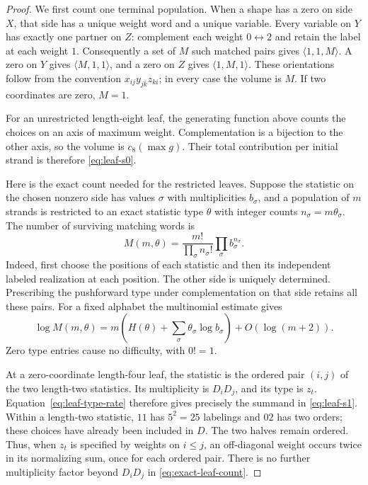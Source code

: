 \begin{proof}
We first count one terminal population.  When a shape has a zero on side
$X$, that side has a unique weight word and a unique variable.  Every
variable on $Y$ has exactly one partner on $Z$: complement each weight
$0\leftrightarrow2$ and retain the label at each weight $1$.
Consequently a set of $M$ such matched pairs gives
$\langle1,1,M\rangle$.  A zero on $Y$ gives
$\langle M,1,1\rangle$, and a zero on $Z$ gives
$\langle1,M,1\rangle$.  These orientations follow from the convention
$x_{ij}y_{jk}z_{ki}$; in every case the volume is $M$.
If two coordinates are zero, $M=1$.

For an unrestricted length-eight leaf, the generating function above
counts the choices on an axis of maximum weight.  Complementation is a
bijection to the other axis, so the volume is $c_8(\max g)$.
Their total contribution per initial strand is therefore
\eqref{eq:leaf-s0}.

Here is the exact count needed for the restricted leaves.  Suppose the
statistic on the chosen nonzero side has values $\sigma$ with
multiplicities $b_\sigma$, and a population of $m$ strands is restricted
to an exact statistic type $\theta$ with integer counts
$n_\sigma=m\theta_\sigma$.  The number of surviving matching words is
\begin{equation}
 M(m,\theta)=\frac{m!}{\prod_\sigma n_\sigma!}
                  \prod_\sigma b_\sigma^{n_\sigma}.
 \label{eq:exact-leaf-count}
\end{equation}
Indeed, first choose the positions of each statistic and then its
independent labeled realization at each position.  The other side is
uniquely determined.  Prescribing the pushforward type under
complementation on that side retains all these pairs.  For a fixed
alphabet the multinomial estimate gives
\begin{equation}
 \log M(m,\theta)
 =m\left(H(\theta)+\sum_\sigma\theta_\sigma\log b_\sigma\right)
        +O(\log(m+2)).
 \label{eq:leaf-type-rate}
\end{equation}
Zero type entries cause no difficulty, with $0!=1$.

At a zero-coordinate length-four leaf, the statistic is the ordered
pair $(i,j)$ of the two length-two statistics.  Its multiplicity is
$D_iD_j$, and its type is $z_t$.  Equation~\eqref{eq:leaf-type-rate}
therefore gives precisely the summand in \eqref{eq:leaf-s1}.
Within a length-two statistic, $11$ has $5^2=25$ labelings and $02$ has
two orders; these choices have already been included in $D$.
The two halves remain ordered.  Thus, when $z_t$ is specified by
weights on $i\leq j$, an off-diagonal weight occurs twice in its
normalizing sum, once for each ordered pair.  There is no further
multiplicity factor beyond $D_iD_j$ in
\eqref{eq:exact-leaf-count}.


\end{proof}
